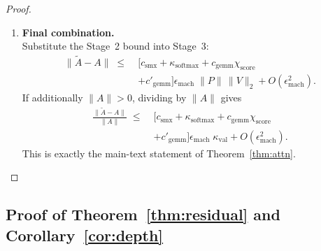 \documentclass[twoside]{article}
\theoremstyle{definition}
\theoremstyle{remark}
\begin{document}
\begin{proof}
\begin{enumerate}
  \item \textbf{Final combination.}\\
  Substitute the Stage~2 bound into Stage~3:
    \[
    \begin{split}
    \|\widetilde{A}-A\|
    \;\le\;& \Big[
      c_{\mathrm{smx}}
      +
      \kappa_{\mathrm{softmax}}
      +
      c_{\mathrm{gemm}}\chi_{\mathrm{score}}
      \\
    & + c'_{\mathrm{gemm}}
    \Big]\epsilon_{\mathrm{mach}}\;\|P\|\,\|V\|_2
    + O(\epsilon_{\mathrm{mach}}^2).
    \end{split}
    \]
  If additionally $\|A\|>0$, dividing by $\|A\|$ gives
    \[
    \begin{split}
    \frac{\|\widetilde{A}-A\|}{\|A\|}
    \;\le\;& \Big[
      c_{\mathrm{smx}}
      +
      \kappa_{\mathrm{softmax}}
      +
      c_{\mathrm{gemm}}\chi_{\mathrm{score}}
      \\
    & + c'_{\mathrm{gemm}}
    \Big]\epsilon_{\mathrm{mach}}\;\kappa_{\mathrm{val}}
    + O(\epsilon_{\mathrm{mach}}^2).
    \end{split}
    \]
  This is exactly the main-text statement of Theorem~\ref{thm:attn}.
\end{enumerate}
\end{proof}

\subsection{Proof of Theorem~\ref{thm:residual} and Corollary~\ref{cor:depth}}
\label{app:residual-proof}
\end{document}
